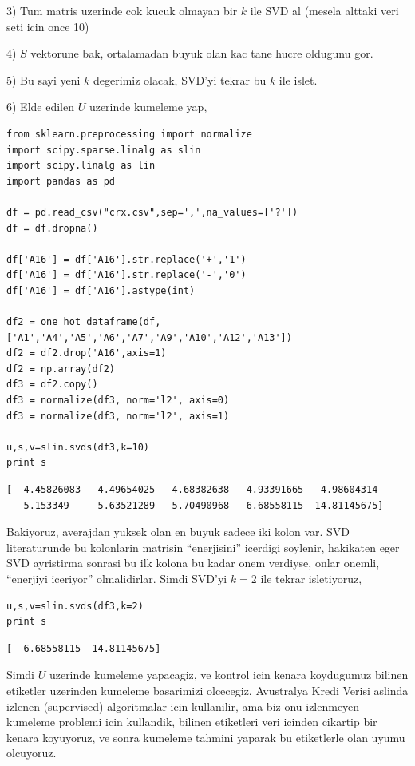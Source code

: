 \documentclass[12pt,fleqn]{article}\usepackage{../common}
\begin{document}
3) Tum matris uzerinde cok kucuk olmayan bir $k$ ile SVD al (mesela alttaki
veri seti icin once 10)

4) $S$ vektorune bak, ortalamadan buyuk olan kac tane hucre oldugunu gor.

5) Bu sayi yeni $k$ degerimiz olacak, SVD'yi tekrar bu $k$ ile islet. 

6) Elde edilen $U$ uzerinde kumeleme yap,

\begin{verbatim}
from sklearn.preprocessing import normalize
import scipy.sparse.linalg as slin
import scipy.linalg as lin
import pandas as pd

df = pd.read_csv("crx.csv",sep=',',na_values=['?'])
df = df.dropna()

df['A16'] = df['A16'].str.replace('+','1')
df['A16'] = df['A16'].str.replace('-','0')
df['A16'] = df['A16'].astype(int)

df2 = one_hot_dataframe(df,['A1','A4','A5','A6','A7','A9','A10','A12','A13'])
df2 = df2.drop('A16',axis=1)
df2 = np.array(df2)
df3 = df2.copy()
df3 = normalize(df3, norm='l2', axis=0)
df3 = normalize(df3, norm='l2', axis=1)

u,s,v=slin.svds(df3,k=10)
print s
\end{verbatim}

\begin{verbatim}
[  4.45826083   4.49654025   4.68382638   4.93391665   4.98604314
   5.153349     5.63521289   5.70490968   6.68558115  14.81145675]
\end{verbatim}

Bakiyoruz, averajdan yuksek olan en buyuk sadece iki kolon var. SVD
literaturunde bu kolonlarin matrisin ``enerjisini'' icerdigi soylenir,
hakikaten eger SVD ayristirma sonrasi bu ilk kolona bu kadar onem verdiyse,
onlar onemli, ``enerjiyi iceriyor'' olmalidirlar. Simdi SVD'yi $k=2$ ile
tekrar isletiyoruz,

\begin{verbatim}
u,s,v=slin.svds(df3,k=2)
print s
\end{verbatim}

\begin{verbatim}
[  6.68558115  14.81145675]
\end{verbatim}

Simdi $U$ uzerinde kumeleme yapacagiz, ve kontrol icin kenara koydugumuz
bilinen etiketler uzerinden kumeleme basarimizi olcecegiz. Avustralya Kredi
Verisi aslinda izlenen (supervised) algoritmalar icin kullanilir, ama biz
onu izlenmeyen kumeleme problemi icin kullandik, bilinen etiketleri veri
icinden cikartip bir kenara koyuyoruz, ve sonra kumeleme tahmini yaparak bu
etiketlerle olan uyumu olcuyoruz. 
\end{document}
